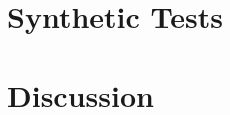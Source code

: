 \documentclass[manuscript,ulem,graphix,revised]{geophysics}
\begin{document}
%




\section{Synthetic Tests}


\section{Discussion}
\end{document}
